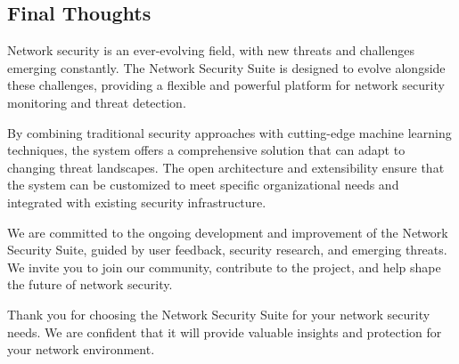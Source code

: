 \subsection{Final Thoughts}
Network security is an ever-evolving field, with new threats and challenges emerging constantly. The Network Security Suite is designed to evolve alongside these challenges, providing a flexible and powerful platform for network security monitoring and threat detection.

By combining traditional security approaches with cutting-edge machine learning techniques, the system offers a comprehensive solution that can adapt to changing threat landscapes. The open architecture and extensibility ensure that the system can be customized to meet specific organizational needs and integrated with existing security infrastructure.

We are committed to the ongoing development and improvement of the Network Security Suite, guided by user feedback, security research, and emerging threats. We invite you to join our community, contribute to the project, and help shape the future of network security.

Thank you for choosing the Network Security Suite for your network security needs. We are confident that it will provide valuable insights and protection for your network environment.